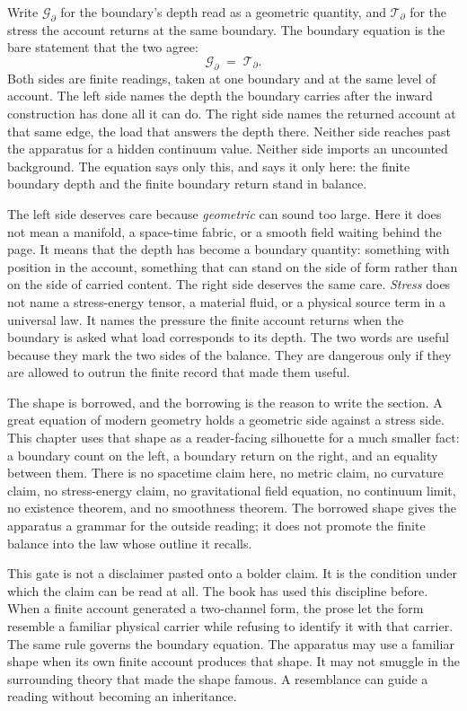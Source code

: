 Write \(\mathcal{G}_{\partial}\) for the boundary's depth read as a geometric quantity, and
\(\mathcal{T}_{\partial}\) for the stress the account returns at the same boundary. The boundary
equation is the bare statement that the two agree:
\[
  \mathcal{G}_{\partial} \;=\; \mathcal{T}_{\partial}.
\]
Both sides are finite readings, taken at one boundary and at the same level of account. The left
side names the depth the boundary carries after the inward construction has done all it can do.
The right side names the returned account at that same edge, the load that answers the depth
there. Neither side reaches past the apparatus for a hidden continuum value. Neither side imports
an uncounted background. The equation says only this, and says it only here: the finite boundary
depth and the finite boundary return stand in balance.

The left side deserves care because \emph{geometric} can sound too large. Here it does not mean a
manifold, a space-time fabric, or a smooth field waiting behind the page. It means that the depth
has become a boundary quantity: something with position in the account, something that can stand
on the side of form rather than on the side of carried content. The right side deserves the same
care. \emph{Stress} does not name a stress-energy tensor, a material fluid, or a physical source
term in a universal law. It names the pressure the finite account returns when the boundary is
asked what load corresponds to its depth. The two words are useful because they mark the two
sides of the balance. They are dangerous only if they are allowed to outrun the finite record that
made them useful.

The shape is borrowed, and the borrowing is the reason to write the section. A great equation of
modern geometry holds a geometric side against a stress side. This chapter uses that shape as a
reader-facing silhouette for a much smaller fact: a boundary count on the left, a boundary return
on the right, and an equality between them. There is no spacetime claim here, no metric claim, no
curvature claim, no stress-energy claim, no gravitational field equation, no continuum limit, no
existence theorem, and no smoothness theorem. The borrowed shape gives the apparatus a grammar
for the outside reading; it does not promote the finite balance into the law whose outline it
recalls.

This gate is not a disclaimer pasted onto a bolder claim. It is the condition under which the
claim can be read at all. The book has used this discipline before. When a finite account
generated a two-channel form, the prose let the form resemble a familiar physical carrier while
refusing to identify it with that carrier. The same rule governs the boundary equation. The
apparatus may use a familiar shape when its own finite account produces that shape. It may not
smuggle in the surrounding theory that made the shape famous. A resemblance can guide a reading
without becoming an inheritance.

